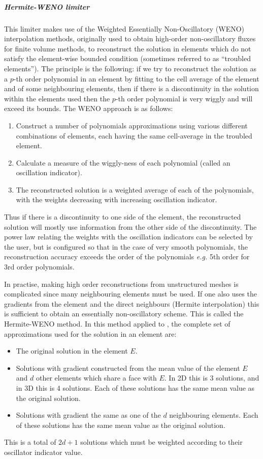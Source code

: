 \subparagraph{Hermite-WENO limiter} \label{sect:ND_hermite_weno_limiter}
This limiter makes use of the Weighted Essentially Non-Oscillatory
(WENO) interpolation methods, originally used to obtain high-order
non-oscillatory fluxes for finite volume methods, to reconstruct the
solution in elements which do not satisfy the element-wise bounded
condition (sometimes referred to as ``troubled elements''). The
principle is the following: if we try to reconstruct the solution as a
$p$-th order polynomial in an element by fitting to the cell average
of the element and of some neighbouring elements, then if there is a
discontinuity in the solution within the elements used then the $p$-th
order polynomial is very wiggly and will exceed its bounds. The WENO
approach is as follows:
\begin{enumerate}
\item Construct a number of polynomials approximations using various
  different combinations of elements, each having the same cell-average
  in the troubled element.
\item Calculate a measure of the wiggly-ness of each polynomial (called
an oscillation indicator).
\item The reconstructed solution is a weighted average of each of the
  polynomials, with the weights decreasing with increasing oscillation
  indicator.
\end{enumerate}
Thus if there is a discontinuity to one side of the element, the
reconstructed solution will mostly use information from the other side
of the discontinuity. The power law relating the weights with the
oscillation indicators can be selected by the user, but is configured
so that in the case of very smooth polynomials, the reconstruction
accuracy exceeds the order of the polynomials \emph{e.g.} 5th order for
3rd order polynomials.

In practise, making high order reconstructions from unstructured
meshes is complicated since many neighbouring elements must be
used. If one also uses the gradients from the element and the direct
neighbours (Hermite interpolation) this is sufficient to obtain an
essentially non-oscillatory scheme. This is called the Hermite-WENO
method. In this method applied to \Pone, the complete set of
approximations used for the solution in an element are:
\begin{itemize}
\item The original solution in the element $E$.
\item Solutions with gradient constructed from the mean value of the
  element $E$ and $d$ other elements which share a face with $E$.  In
  2D this is 3 solutions, and in 3D this is 4 solutions. Each of these
  solutions has the same mean value as the original solution.
\item Solutions with gradient the same as one of the $d$ neighbouring
  elements. Each of these solutions has the same mean value as the
  original solution.
\end{itemize}
This is a total of $2d+1$ solutions which must be weighted according
to their oscillator indicator value.

